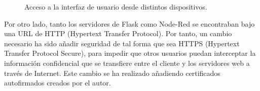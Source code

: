\begin{figure}[h!]
  \begin{center}
    \hspace{2mm}
  \end{center}
\caption{Acceso a la interfaz de usuario desde distintos dispositivos.} \label{fig:userlogin}
\end{figure}

Por otro lado, tanto los servidores de Flask como Node-Red se encontraban bajo una URL de HTTP (Hypertext Transfer Protocol). Por tanto, un cambio necesario ha sido añadir seguridad de tal forma que sea HTTPS (Hypertext Transfer Protocol Secure), para impedir que otros usuarios puedan interceptar la información confidencial que se transfiere entre el cliente y los servidores web a través de Internet. Este cambio se ha realizado añadiendo certificados autofirmados creados por el autor.\\

